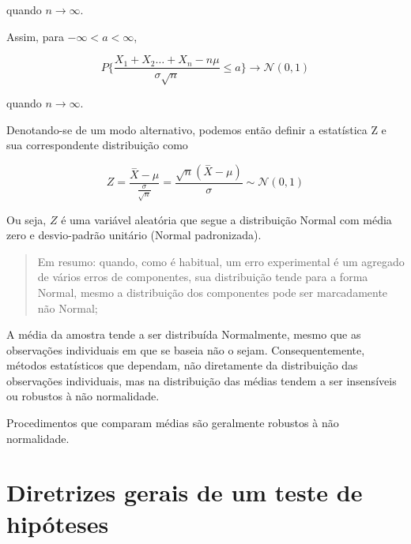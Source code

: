 \documentclass[
]{book}
\begin{document}
quando \(n \to \infty\).

\hfill\break

Assim, para \(-\infty < a < \infty\),

\hfill\break

\[
P \{ \frac{X_{1} + X_{2} \dots + X_{n} - n \mu}{\sigma \sqrt{n}} \leq a\}\to \mathcal{N}(0,1)  
\]

\hfill\break

quando \(n \to \infty\).

\hfill\break

Denotando-se de um modo alternativo, podemos então definir a estatística Z e sua correspondente distribuição como

\hfill\break

\[
Z = \frac{ \stackrel{-}{X} - \mu }{  \frac{\sigma}{\sqrt{n}}  } = \frac{\sqrt{n}\left(\stackrel{-}{X}-\mu \right)}{\sigma } \sim  \mathcal{N}(0,1)
\]

\hfill\break

Ou seja, \(Z\) é uma variável aleatória que segue a distribuição Normal com média zero e desvio-padrão unitário (Normal padronizada).

\hfill\break

\begin{quote}
Em resumo: quando, como é habitual, um erro experimental é um agregado de vários erros de componentes, sua distribuição tende para a forma Normal, mesmo a distribuição dos componentes pode ser marcadamente não Normal;
\end{quote}

\hfill\break

A média da amostra tende a ser distribuída Normalmente, mesmo que as observações individuais em que se baseia não o sejam. Consequentemente, métodos estatísticos que dependam, não diretamente da distribuição das observações individuais, mas na distribuição das médias tendem a ser insensíveis ou robustos à não normalidade.

\hfill\break

Procedimentos que comparam médias são geralmente robustos à não normalidade.

\hypertarget{diretrizes-gerais-de-um-teste-de-hipuxf3teses}{%
\section{Diretrizes gerais de um teste de hipóteses}\label{diretrizes-gerais-de-um-teste-de-hipuxf3teses}}
\end{document}
